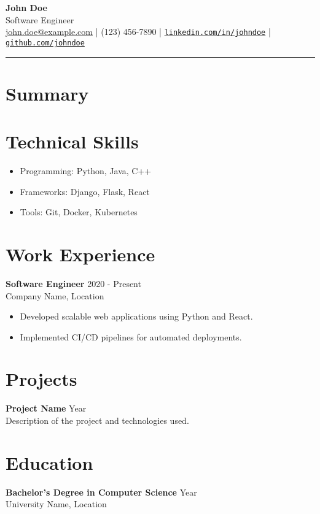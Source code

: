 \documentclass[a4paper,10pt]{article}
\begin{document}
\begin{center}
    {\Huge \textbf{John Doe}}\\
    {\large Software Engineer}\\
    \href{mailto:john.doe@example.com}{john.doe@example.com} | (123) 456-7890 | 
    \href{https://linkedin.com/in/johndoe}{\texttt{linkedin.com/in/johndoe}} | 
    \href{https://github.com/johndoe}{\texttt{github.com/johndoe}}
\end{center}

\hrule

\section*{Summary}

\section*{Technical Skills}
\begin{itemize}
    \item Programming: Python, Java, C++
    \item Frameworks: Django, Flask, React
    \item Tools: Git, Docker, Kubernetes
\end{itemize}

\section*{Work Experience}
\textbf{Software Engineer} \hfill 2020 - Present\\
Company Name, Location\\
\begin{itemize}
    \item Developed scalable web applications using Python and React.
    \item Implemented CI/CD pipelines for automated deployments.
\end{itemize}

\section*{Projects}
\textbf{Project Name} \hfill Year\\
Description of the project and technologies used.

\section*{Education}
\textbf{Bachelor's Degree in Computer Science} \hfill Year\\
University Name, Location
\end{document}
